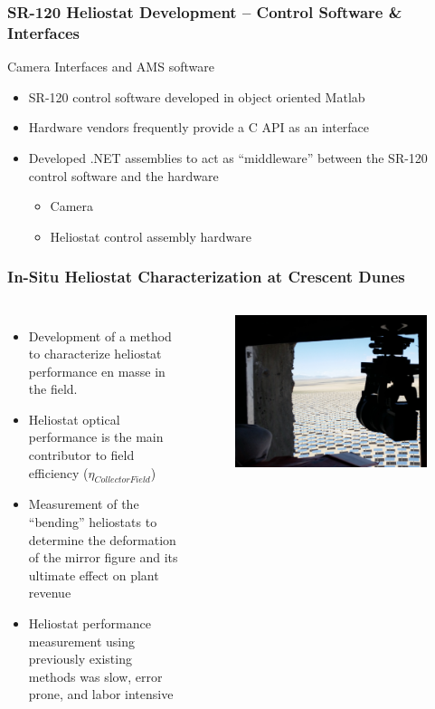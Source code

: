 \documentclass[aspectratio=169]{beamer}
\begin{document}
\begin{frame}
  \frametitle{SR-120 Heliostat Development -- Control Software \& Interfaces}
  Camera Interfaces and AMS software
  \begin{itemize}
  \item SR-120 control software developed in object oriented Matlab
  \item Hardware vendors frequently provide a C API as an interface
  \item Developed .NET assemblies to act as ``middleware'' between
    the SR-120 control software and the hardware
    \begin{itemize}
    \item Camera
    \item Heliostat control assembly hardware
    \end{itemize}
  \end{itemize}
\end{frame}

\begin{frame}
  \frametitle{In-Situ Heliostat Characterization at Crescent Dunes}
  \begin{columns}[t]
    \begin{itemize}
    \item Development of a method to characterize heliostat
      performance en masse in the field.
    \item Heliostat optical performance is the main contributor to
      field efficiency ($\eta_{CollectorField}$)
    \item Measurement of the ``bending'' heliostats to determine the
      deformation of the mirror figure and its ultimate effect on
      plant revenue
    \item Heliostat performance measurement using previously existing
      methods was slow, error prone, and labor intensive
    \end{itemize}
    \begin{figure}
      \includegraphics[width=\textwidth]{In_Situ_View.jpg}
    \end{figure}
  \end{columns}
\end{frame}
\end{document}
